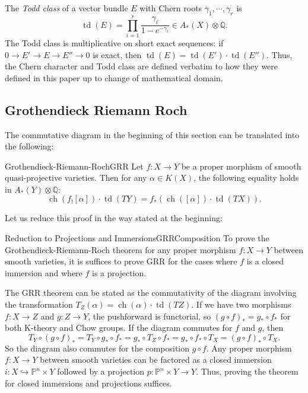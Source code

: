 \documentclass{ut-thesis}
\newenvironment{Proof}[1][]
  {\begin{ProofTcb}[#1]}
  {\end{ProofTcb}}
\newcommand{\Q}{{\mathbb{Q}}}
\renewcommand{\P}{{\mathbb{P}}}
\newcommand{\ch}{{\operatorname{ch}}}
\newcommand{\td}{{\operatorname{td}}}
\renewcommand{\ch}{{\operatorname{ch}}}
\begin{document}
The \emph{Todd class} of a vector bundle $E$ with Chern roots $\gamma_1, \cdots, \gamma_r$ is \[ \td(E) =
\prod_{i=1}^r \frac{\gamma_i}{1 - e^{-\gamma_i}} \in A_*(X) \otimes \Q. \] The Todd class is multiplicative on
short exact sequences: if $0 \to E' \to E \to E'' \to 0$ is exact, then $\td(E) = \td(E') \cdot \td(E'')$.
Thus, the Chern character and Todd class are defined verbatim to how they were defined in this paper up to
change of mathematical domain.

\subsection*{Grothendieck Riemann Roch}

The commutative diagram in the beginning of this section can be translated into the following:

\begin{thm}{Grothendieck-Riemann-Roch}{GRR}
    Let $f: X \to Y$ be a proper morphism of smooth quasi-projective varieties. Then for any $\alpha \in
    K(X)$, the following equality holds in $A_*(Y) \otimes \Q$:
    \[
      \ch(f_! [\alpha]) \cdot \td(TY) = f_*(\ch([\alpha]) \cdot \td(TX)).
    \]
\end{thm}

Let us reduce this proof in the way stated at the beginning:

\begin{prop}{Reduction to Projections and Immersions}{GRRComposition}
    To prove the Grothendieck-Riemann-Roch theorem for any proper morphism $f: X \to Y$ between smooth
    varieties, it is suffices to prove GRR for the cases where $f$ is a closed immersion and where $f$ is a projection.
\end{prop}
\begin{Proof}
    The GRR theorem can be stated as the commutativity of the diagram involving the transformation $T_Z(\alpha) = \ch(\alpha) \cdot \td(TZ)$. If we have two morphisms $f: X \to Z$ and $g: Z \to Y$, the pushforward is functorial, so $(g \circ f)_* = g_* \circ f_*$ for both K-theory and Chow groups. If the diagram commutes for $f$ and $g$, then
    \[ T_Y \circ (g \circ f)_* = T_Y \circ g_* \circ f_* = g_* \circ T_Z \circ f_* = g_* \circ f_* \circ T_X = (g \circ f)_* \circ T_X. \]
    So the diagram also commutes for the composition $g \circ f$. Any proper morphism $f: X \to Y$ between smooth varieties can be factored as a closed immersion $i: X \hookrightarrow \P^n \times Y$ followed by a projection $p: \P^n \times Y \to Y$. Thus, proving the theorem for closed immersions and projections suffices.
\end{Proof}
\end{document}
